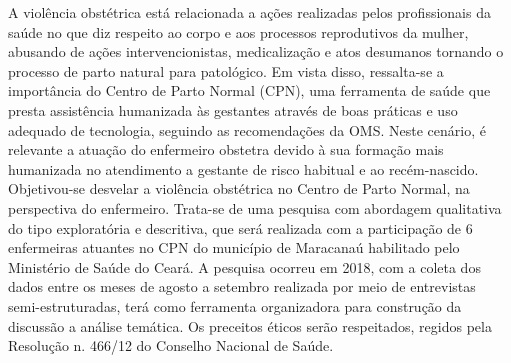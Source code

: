 A violência obstétrica está relacionada a ações realizadas pelos profissionais da saúde no que diz respeito ao corpo e aos processos reprodutivos da mulher, abusando de ações intervencionistas, medicalização e atos desumanos tornando o processo de parto natural para patológico. Em vista disso, ressalta-se a importância do Centro de Parto Normal (CPN), uma ferramenta de saúde que presta assistência humanizada às gestantes através de boas práticas e uso adequado de tecnologia, seguindo as recomendações da OMS. Neste cenário, é relevante a atuação do enfermeiro obstetra devido à sua formação mais humanizada no atendimento a gestante de risco habitual e ao recém-nascido. Objetivou-se desvelar a violência obstétrica no Centro de Parto Normal, na perspectiva do enfermeiro. Trata-se de uma pesquisa com abordagem qualitativa do tipo exploratória e descritiva, que será realizada com a participação de 6 enfermeiras atuantes no CPN do município de Maracanaú habilitado pelo Ministério de Saúde do Ceará. A pesquisa ocorreu em 2018, com a coleta dos dados entre os meses de agosto a setembro realizada por meio de entrevistas semi-estruturadas, terá como ferramenta organizadora para construção da discussão a análise temática. Os preceitos éticos serão respeitados, regidos pela Resolução n. 466/12 do Conselho Nacional de Saúde.

